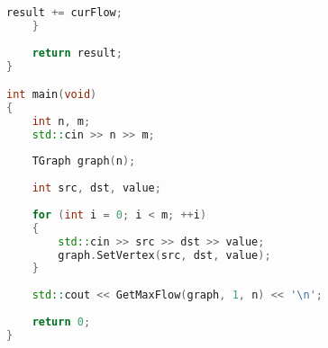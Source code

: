 \begin{lstlisting}[language=C++]
		result += curFlow;
	}
	
	return result;
}

int main(void)
{
	int n, m;
	std::cin >> n >> m;
	
	TGraph graph(n);
	
	int src, dst, value;
	
	for (int i = 0; i < m; ++i) 
	{
		std::cin >> src >> dst >> value;
		graph.SetVertex(src, dst, value);
	}
	
	std::cout << GetMaxFlow(graph, 1, n) << '\n';
	
	return 0;
}


\end{lstlisting}

\pagebreak

